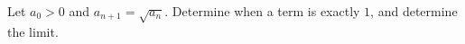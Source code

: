 Let $a_0>0$ and $a_{n+1}=\sqrt{a_n}$. Determine when a term is exactly $1$, and determine the limit.
